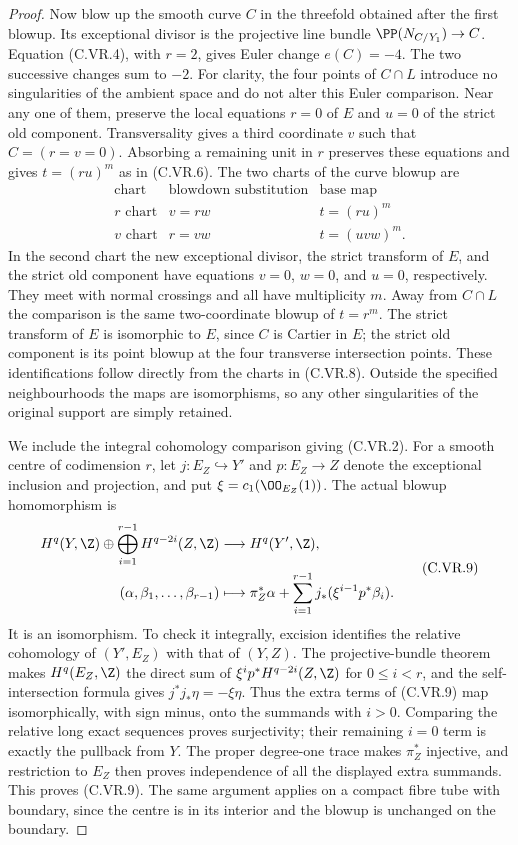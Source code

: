 \begin{proof}
Now blow up the smooth curve $C$ in the threefold obtained after the
first blowup. Its exceptional divisor is the projective line bundle
$\PP(N_{C/Y_1})\to C$. Equation (C.VR.4), with $r=2$, gives Euler
change $e(C)=-4$. The two successive changes sum to $-2$.
For clarity, the four points of $C\cap L$ introduce no singularities
of the ambient space and do not alter this Euler comparison. Near any
one of them, preserve the local equations $r=0$ of $E$ and $u=0$ of
the strict old component. Transversality gives a third coordinate $v$
such that $C=(r=v=0)$. Absorbing a remaining unit in $r$ preserves
these equations and gives $t=(ru)^m$ as in (C.VR.6). The two charts of
the curve blowup are
\[
 \begin{array}{c|c|c}
 \text{chart}&\text{blowdown substitution}&\text{base map}\\ \hline
 \text{$r$ chart}&v=rw&t=(ru)^m\\
 \text{$v$ chart}&r=vw&t=(uvw)^m .
 \end{array}                                      \tag{C.VR.8}
\]
In the second chart the new exceptional divisor, the strict transform
of $E$, and the strict old component have equations $v=0$, $w=0$,
and $u=0$, respectively. They meet with normal crossings and all
have multiplicity $m$. Away from $C\cap L$ the comparison is the
same two-coordinate blowup of $t=r^m$. The strict transform of $E$
is isomorphic to $E$, since $C$ is Cartier in $E$; the strict old
component is its point blowup at the four transverse intersection
points. These identifications follow directly from the charts in
(C.VR.8). Outside the specified neighbourhoods the maps are
isomorphisms, so any other singularities of the original support
are simply retained.

We include the integral cohomology comparison giving (C.VR.2).
For a smooth centre of codimension $r$, let $j:E_Z\hookrightarrow Y'$
and $p:E_Z\to Z$ denote the exceptional inclusion and projection,
and put $\xi=c_1(\OO_{E_Z}(1))$. The actual blowup homomorphism is
\[
 \begin{split}
 H^q(Y,\Z)\oplus\bigoplus_{i=1}^{r-1}H^{q-2i}(Z,\Z)
   &\longrightarrow H^q(Y',\Z),\\
 (\alpha,\beta_1,\ldots,\beta_{r-1})
   &\longmapsto \pi_Z^*\alpha+
       \sum_{i=1}^{r-1}j_*(\xi^{i-1}p^*\beta_i).
 \end{split}                                      \tag{C.VR.9}
\]
It is an isomorphism. To check it integrally, excision identifies the
relative cohomology of $(Y',E_Z)$ with that of $(Y,Z)$. The
projective-bundle theorem makes $H^q(E_Z,\Z)$ the direct sum of
$\xi^i p^*H^{q-2i}(Z,\Z)$ for $0\le i<r$, and the self-intersection
formula gives $j^*j_*\eta=-\xi\eta$. Thus the extra terms of
(C.VR.9) map isomorphically, with sign minus, onto the summands with
$i>0$. Comparing the relative long exact sequences proves
surjectivity; their remaining $i=0$ term is exactly the pullback from
$Y$. The proper degree-one trace makes $\pi_Z^*$ injective, and
restriction to $E_Z$ then proves independence of all the displayed
extra summands. This proves (C.VR.9). The same argument applies on a
compact fibre tube with boundary, since the centre is in its interior
and the blowup is unchanged on the boundary.


\end{proof}

